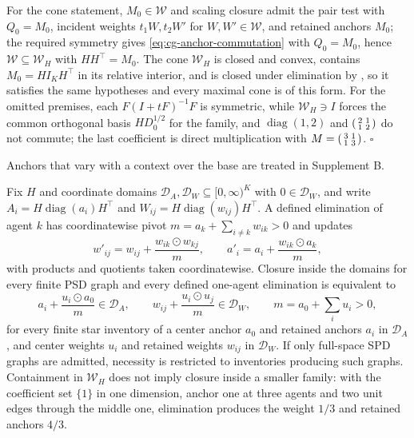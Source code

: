 For the cone statement, \(M_0\in\mathcal W\) and scaling closure admit the pair
test with \(Q_0=M_0\), incident weights \(t_1W,t_2W'\) for
\(W,W'\in\mathcal W\), and retained anchors \(M_0\); the required symmetry
gives \eqref{eq:cg-anchor-commutation} with \(Q_0=M_0\), hence
\(\mathcal W\subseteq\mathcal W_H\) with \(HH^\top=M_0\). The cone
\(\mathcal W_H\) is closed and convex, contains \(M_0=HI_KH^\top\) in its
relative interior, and is closed under elimination by
, so it satisfies the same hypotheses and
every maximal cone is of this form. For the omitted premises, each
\(F(I+tF)^{-1}F\) is symmetric, while \(\mathcal W_H\ni I\) forces the common
orthogonal basis \(HD_0^{1/2}\) for the family, and
\(\operatorname{diag}(1,2)\) and \(\begin{psmallmatrix}2&1\\1&2\end{psmallmatrix}\)
do not commute; the last coefficient is direct multiplication with
\(M=\begin{psmallmatrix}3&1\\1&3\end{psmallmatrix}\). \(\square\)

Anchors that vary with a context over the base are treated in Supplement B.

Fix \(H\) and coordinate domains
\(\mathscr D_A,\mathscr D_W\subseteq[0,\infty)^K\) with
\(0\in\mathscr D_W\), and write \(A_i=H\operatorname{diag}(a_i)H^\top\) and
\(W_{ij}=H\operatorname{diag}(w_{ij})H^\top\). A defined elimination of agent
\(k\) has coordinatewise pivot \(m=a_k+\sum_{i\neq k}w_{ik}>0\) and updates
\begin{equation}
w'_{ij}=w_{ij}+\frac{w_{ik}\odot w_{kj}}{m},\qquad
a'_i=a_i+\frac{w_{ik}\odot a_k}{m},
\label{eq:cg-kron-scalar-updates}
\end{equation}
with products and quotients taken coordinatewise. Closure inside the domains
for every finite PSD graph and every defined one-agent elimination is
equivalent to
\begin{equation}
a_i+\frac{u_i\odot a_0}{m}\in\mathscr D_A,\qquad
w_{ij}+\frac{u_i\odot u_j}{m}\in\mathscr D_W,\qquad
m=a_0+\sum_iu_i>0,
\label{eq:cg-kron-star-domain}
\end{equation}
for every finite star inventory of a center anchor \(a_0\) and retained anchors
\(a_i\) in \(\mathscr D_A\), and center weights \(u_i\) and retained weights
\(w_{ij}\) in \(\mathscr D_W\). If only full-space SPD graphs are admitted,
necessity is restricted to inventories producing such graphs. Containment in
\(\mathcal W_H\) does not imply closure inside a smaller family: with the
coefficient set \(\{1\}\) in one dimension, anchor one at three agents and two
unit edges through the middle one, elimination produces the weight \(1/3\) and
retained anchors \(4/3\). 

